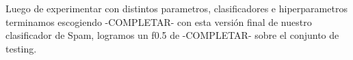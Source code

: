 
Luego de experimentar con distintos parametros, clasificadores e hiperparametros terminamos escogiendo -COMPLETAR- con esta versión final de nuestro clasificador de Spam, logramos un f0.5 de -COMPLETAR- sobre el conjunto de testing. 